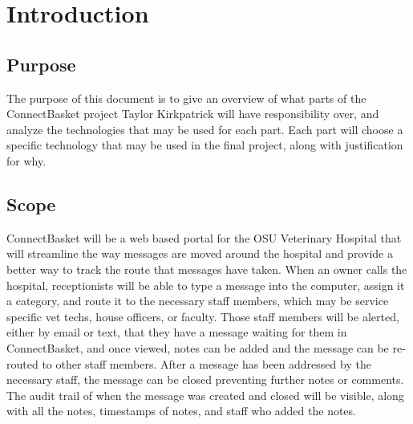 \documentclass[onecolumn, draftclsnofoot,10pt, compsoc]{IEEEtran}
\begin{document}
\section{Introduction}

\subsection{Purpose}
The purpose of this document is to give an overview of what parts of the ConnectBasket project Taylor Kirkpatrick will have responsibility over,
and analyze the technologies that may be used for each part. Each part will choose a specific technology that may be used in the final project, 
along with justification for why.


\subsection{Scope}
ConnectBasket will be a web based portal for the OSU Veterinary Hospital that will streamline the way messages are moved around the hospital and 
provide a better way to track the route that messages have taken. When an owner calls the hospital, receptionists will be able to type a message 
into the computer, assign it a category, and route it to the necessary staff members, which may be service specific vet techs, house officers, or 
faculty. Those staff members will be alerted, either by email or text, that they have a message waiting for them in ConnectBasket, and once viewed, 
notes can be added and the message can be re-routed to other staff members. After a message has been addressed by the necessary staff, the message 
can be closed preventing further notes or comments. The audit trail of when the message was created and closed will be visible, along with all the 
notes, timestamps of notes, and staff who added the notes.
\end{document}
